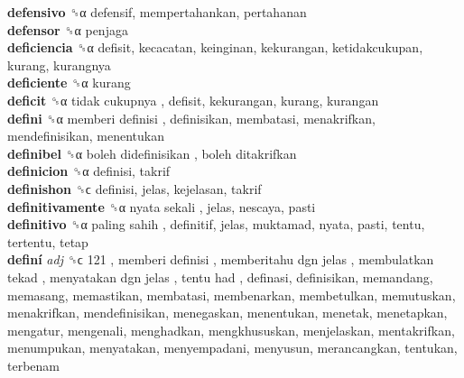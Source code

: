 \textbf{defensivo} ␝α  defensif, mempertahankan, pertahanan  \\
\textbf{defensor} ␝α  penjaga  \\
\textbf{deficiencia} ␝α  defisit, kecacatan, keinginan, kekurangan, ketidakcukupan, kurang, kurangnya  \\
\textbf{deficiente} ␝α  kurang  \\
\textbf{deficit} ␝α   tidak cukupnya , defisit, kekurangan, kurang, kurangan  \\
\textbf{defini} ␝α   memberi definisi , definisikan, membatasi, menakrifkan, mendefinisikan, menentukan  \\
\textbf{definibel} ␝α   boleh didefinisikan ,  boleh ditakrifkan   \\
\textbf{definicion} ␝α  definisi, takrif  \\
\textbf{definishon} ␝ϲ  definisi, jelas, kejelasan, takrif  \\
\textbf{definitivamente} ␝α   nyata sekali , jelas, nescaya, pasti  \\
\textbf{definitivo} ␝α   paling sahih , definitif, jelas, muktamad, nyata, pasti, tentu, tertentu, tetap  \\
\textbf{definí} \emph{adj}  ␝ϲ   121 ,  memberi definisi ,  memberitahu dgn jelas ,  membulatkan tekad ,  menyatakan dgn jelas ,  tentu had , definasi, definisikan, memandang, memasang, memastikan, membatasi, membenarkan, membetulkan, memutuskan, menakrifkan, mendefinisikan, menegaskan, menentukan, menetak, menetapkan, mengatur, mengenali, menghadkan, mengkhususkan, menjelaskan, mentakrifkan, menumpukan, menyatakan, menyempadani, menyusun, merancangkan, tentukan, terbenam  \\

